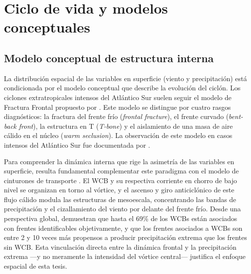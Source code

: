 
\section{Ciclo de vida y modelos conceptuales}\label{sec:tb_evolucion}

\subsection{Modelo conceptual de estructura interna}\label{subsec:tb_modelos}

La distribución espacial de las variables en superficie (viento y precipitación) está condicionada por el modelo conceptual que describe la evolución del ciclón. Los ciclones extratropicales intensos del Atlántico Sur suelen seguir el modelo de Fractura Frontal propuesto por \citet{shapiro1990life}. Este modelo se distingue por cuatro rasgos diagnósticos: la fractura del frente frío (\textit{frontal fracture}), el frente curvado (\textit{bent-back front}), la estructura en T (\textit{T-bone}) y el aislamiento de una masa de aire cálido en el núcleo (\textit{warm seclusion}). La observación de este modelo en casos intensos del Atlántico Sur fue documentada por \citet{shapiro1999bridge}.

Para comprender la dinámica interna que rige la asimetría de las variables en superficie, resulta fundamental complementar este paradigma con el modelo de cinturones de transporte \citep{browning1986conceptual}. El WCB y su respectiva corriente en chorro de bajo nivel se organizan en torno al vórtice, y el ascenso y giro anticiclónico de este flujo cálido modula las estructuras de mesoescala, concentrando las bandas de precipitación y el cizallamiento del viento por delante del frente frío. Desde una perspectiva global, \citet{catto2015fronts} demuestran que hasta el 69\% de los WCBs están asociados con frentes identificables objetivamente, y que los frentes asociados a WCBs son entre 2 y 10 veces más propensos a producir precipitación extrema que los frentes sin WCB. Esta vinculación directa entre la dinámica frontal y la precipitación extrema —y no meramente la intensidad del vórtice central— justifica el enfoque espacial de esta tesis.

